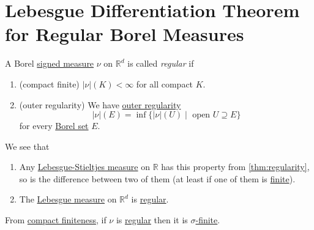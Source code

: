 \section{Lebesgue Differentiation Theorem for Regular Borel Measures}
\begin{definition}[Regular]\label{def:regular}
	A Borel \hyperref[def:signed-measure]{signed measure} \(\nu\) on \(\mathbb{R}^d\) is called \emph{regular} if
	\begin{enumerate}[(1)]
		\item\label{def:regular-compact-finite} (compact finite) \(\left\vert \nu \right\vert(K) < \infty\) for all compact \(K\).
		\item\label{def:regular-outer-regularity} (outer regularity) We have \hyperref[thm:regularity]{outer regularity}
		\[
			\left\vert \nu \right\vert(E) = \inf\{\left\vert \nu \right\vert(U) \mid \text{ open } U \supseteq E\}
		\]
		for every \hyperref[def:Borel-set]{Borel set} \(E\).
	\end{enumerate}
\end{definition}

\begin{eg}
	We see that
	\begin{enumerate}[(1)]
		\item Any \hyperref[def:Lebesgue-Stieltjes-measure]{Lebesgue-Stieltjes measure} on \(\mathbb{R}\) has this property from \autoref{thm:regularity},
		      so is the difference between two of them (at least if one of them is \hyperref[def:finite-signed-measure]{finite}).
		\item The \hyperref[def:Lebesgue-measure]{Lebesgue measure} on \(\mathbb{R}^d\) is \hyperref[def:regular]{regular}.
	\end{enumerate}
\end{eg}

\begin{note}
	From \hyperref[def:regular-compact-finite]{compact finiteness}, if \(\nu\) is \hyperref[def:regular]{regular} then it is
	\hyperref[def:finite-signed-measure]{\(\sigma\)-finite}.
\end{note}

